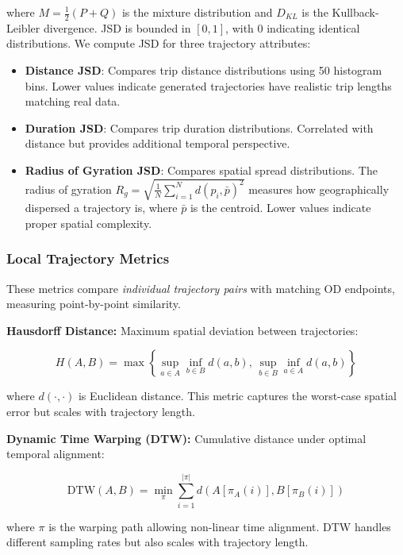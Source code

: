 where $M = \frac{1}{2}(P + Q)$ is the mixture distribution and $D_{KL}$ is the Kullback-Leibler divergence. JSD is bounded in $[0, 1]$, with 0 indicating identical distributions. We compute JSD for three trajectory attributes:

\begin{itemize}[noitemsep,topsep=0pt]
\item \textbf{Distance JSD}: Compares trip distance distributions using 50 histogram bins. Lower values indicate generated trajectories have realistic trip lengths matching real data.
\item \textbf{Duration JSD}: Compares trip duration distributions. Correlated with distance but provides additional temporal perspective.
\item \textbf{Radius of Gyration JSD}: Compares spatial spread distributions. The radius of gyration $R_g = \sqrt{\frac{1}{N} \sum_{i=1}^{N} d(p_i, \bar{p})^2}$ measures how geographically dispersed a trajectory is, where $\bar{p}$ is the centroid. Lower values indicate proper spatial complexity.
\end{itemize}

\subsubsection{Local Trajectory Metrics}

These metrics compare \emph{individual trajectory pairs} with matching OD endpoints, measuring point-by-point similarity.

\textbf{Hausdorff Distance:} Maximum spatial deviation between trajectories:

\begin{equation}
H(A, B) = \max \left\{ \sup_{a \in A} \inf_{b \in B} d(a, b), \, \sup_{b \in B} \inf_{a \in A} d(a, b) \right\}
\end{equation}

where $d(\cdot, \cdot)$ is Euclidean distance. This metric captures the worst-case spatial error but scales with trajectory length.

\textbf{Dynamic Time Warping (DTW):} Cumulative distance under optimal temporal alignment:

\begin{equation}
\text{DTW}(A, B) = \min_{\pi} \sum_{i=1}^{|\pi|} d(A[\pi_A(i)], B[\pi_B(i)])
\end{equation}

where $\pi$ is the warping path allowing non-linear time alignment. DTW handles different sampling rates but also scales with trajectory length.

